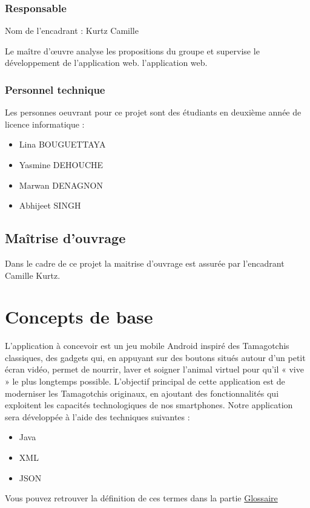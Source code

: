 \documentclass{cahier_des_charges}
\begin{document}
\subsubsection{Responsable}
Nom de l'encadrant : Kurtz Camille 

Le maître d’œuvre analyse les propositions du groupe et supervise le développement de l'application web.
l'application web.
\subsubsection{Personnel technique}
Les personnes oeuvrant pour ce projet sont des étudiants en deuxième année de licence informatique :
\begin{itemize}[label=\textbullet]
\item Lina BOUGUETTAYA 
\item Yasmine DEHOUCHE
\item Marwan DENAGNON 
\item Abhijeet SINGH
\end{itemize}
\subsection{Maîtrise d'ouvrage}
Dans le cadre de ce projet la maitrise d’ouvrage est assurée par l’encadrant Camille Kurtz.
\section{Concepts de base}
L’application à concevoir est un jeu mobile Android inspiré des Tamagotchis classiques, des gadgets qui, en appuyant sur des boutons situés autour d'un petit écran vidéo, permet de nourrir, laver et soigner l'animal virtuel pour qu'il « vive » le plus longtemps possible. L’objectif principal de cette application est de moderniser les Tamagotchis originaux, en ajoutant des fonctionnalités qui exploitent les capacités technologiques de nos smartphones. Notre application sera développée à l’aide des techniques suivantes :
\begin{itemize}[label=\textbullet]
\item Java
\item XML
\item JSON
\end{itemize}
Vous pouvez retrouver la définition de ces termes dans la partie \protect\hyperref[sec:glossaire]{Glossaire}
\end{document}
